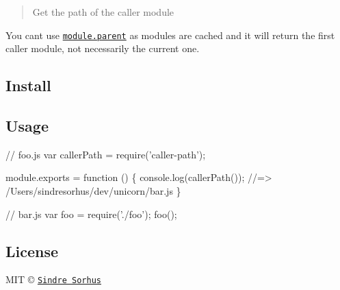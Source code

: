 \begin{quote}
Get the path of the caller module \end{quote}


You can\textquotesingle{}t use \href{http://nodejs.org/api/modules.html#modules_module_parent}{\tt {\ttfamily module.\+parent}} as modules are cached and it will return the first caller module, not necessarily the current one.

\subsection*{Install}




\subsection*{Usage}


\begin{DoxyCode}
// foo.js
var callerPath = require('caller-path');

module.exports = function () \{
    console.log(callerPath());
    //=> /Users/sindresorhus/dev/unicorn/bar.js
\}
\end{DoxyCode}



\begin{DoxyCode}
// bar.js
var foo = require('./foo');
foo();
\end{DoxyCode}


\subsection*{License}

M\+IT © \href{http://sindresorhus.com}{\tt Sindre Sorhus} 
